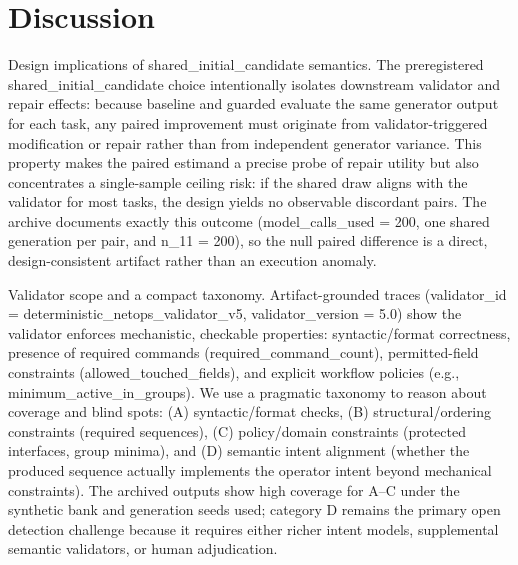 \documentclass[conference]{IEEEtran}
\begin{document}
\section{Discussion}
Design implications of shared\_initial\_candidate semantics. The preregistered shared\_initial\_candidate choice intentionally isolates downstream validator and repair effects: because baseline and guarded evaluate the same generator output for each task, any paired improvement must originate from validator-triggered modification or repair rather than from independent generator variance. This property makes the paired estimand a precise probe of repair utility but also concentrates a single-sample ceiling risk: if the shared draw aligns with the validator for most tasks, the design yields no observable discordant pairs. The archive documents exactly this outcome (model\_calls\_used = 200, one shared generation per pair, and n\_11 = 200), so the null paired difference is a direct, design-consistent artifact rather than an execution anomaly.

Validator scope and a compact taxonomy. Artifact-grounded traces (validator\_id = deterministic\_netops\_validator\_v5, validator\_version = 5.0) show the validator enforces mechanistic, checkable properties: syntactic/format correctness, presence of required commands (required\_command\_count), permitted-field constraints (allowed\_touched\_fields), and explicit workflow policies (e.g., minimum\_active\_in\_groups). We use a pragmatic taxonomy to reason about coverage and blind spots: (A) syntactic/format checks, (B) structural/ordering constraints (required sequences), (C) policy/domain constraints (protected interfaces, group minima), and (D) semantic intent alignment (whether the produced sequence actually implements the operator intent beyond mechanical constraints). The archived outputs show high coverage for A--C under the synthetic bank and generation seeds used; category D remains the primary open detection challenge because it requires either richer intent models, supplemental semantic validators, or human adjudication.
\end{document}
